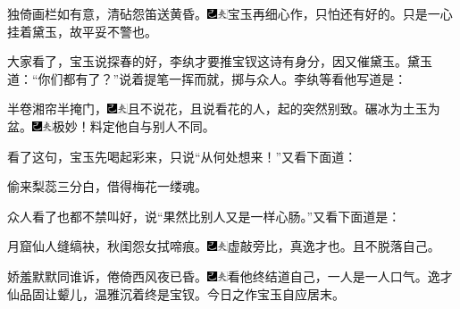 独倚画栏如有意，清砧怨笛送黄昏。{\includegraphics[width=3mm]{../Images/00003}\includegraphics[width=3mm]{../Images/00012}\footnotesize \kaishu 宝玉再细心作，只怕还有好的。只是一心挂着黛玉，故平妥不警也。}

大家看了，宝玉说探春的好，李纨才要推宝钗这诗有身分，因又催黛玉。黛玉道：``你们都有了？''说着提笔一挥而就，掷与众人。李纨等看他写道是：

半卷湘帘半掩门，{\includegraphics[width=3mm]{../Images/00003}\includegraphics[width=3mm]{../Images/00012}\footnotesize \kaishu 且不说花，且说看花的人，起的突然别致。}碾冰为土玉为盆。{\includegraphics[width=3mm]{../Images/00003}\includegraphics[width=3mm]{../Images/00012}\footnotesize \kaishu 极妙！料定他自与别人不同。}

看了这句，宝玉先喝起彩来，只说``从何处想来！''又看下面道：

偷来梨蕊三分白，借得梅花一缕魂。

众人看了也都不禁叫好，说``果然比别人又是一样心肠。''又看下面道是：

月窟仙人缝缟袂，秋闺怨女拭啼痕。{\includegraphics[width=3mm]{../Images/00003}\includegraphics[width=3mm]{../Images/00012}\footnotesize \kaishu 虚敲旁比，真逸才也。且不脱落自己。}

娇羞默默同谁诉，倦倚西风夜已昏。{\includegraphics[width=3mm]{../Images/00003}\includegraphics[width=3mm]{../Images/00012}\footnotesize \kaishu 看他终结道自己，一人是一人口气。逸才仙品固让颦儿，温雅沉着终是宝钗。今日之作宝玉自应居末。}

